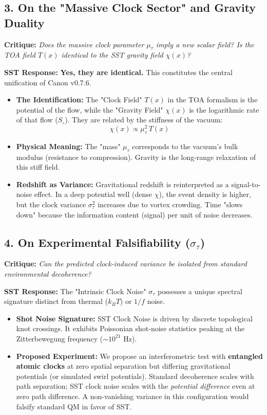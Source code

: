 \documentclass[10pt]{article}
\begin{document}
\subsection*{3. On the "Massive Clock Sector" and Gravity Duality}\label{sec:massive-clock-gravity}
\noindent \textbf{Critique:} \textit{Does the massive clock parameter $\mu_\tau$ imply a new scalar field? Is the TOA field $T(x)$ identical to the SST gravity field $\chi(x)$?}

\noindent \textbf{SST Response:}
\textbf{Yes, they are identical.} This constitutes the central unification of Canon v0.7.6.
\begin{itemize}
    \item \textbf{The Identification:} The "Clock Field" $T(x)$ in the TOA formalism is the potential of the flow, while the "Gravity Field" $\chi(x)$ is the logarithmic rate of that flow ($S_\circ$). They are related by the stiffness of the vacuum:
    \begin{equation}
        \chi(x) \propto \mu_\tau^2 \, T(x)
    \end{equation}
    \item \textbf{Physical Meaning:} The "mass" $\mu_\tau$ corresponds to the vacuum's bulk modulus (resistance to compression). Gravity is the long-range relaxation of this stiff field.
    \item \textbf{Redshift as Variance:} Gravitational redshift is reinterpreted as a signal-to-noise effect. In a deep potential well (dense $\chi$), the event density is higher, but the clock variance $\sigma_\tau^2$ increases due to vortex crowding. Time "slows down" because the information content (signal) per unit of noise decreases.
\end{itemize}

\subsection*{4. On Experimental Falsifiability ($\sigma_\tau$)}
\noindent \textbf{Critique:} \textit{Can the predicted clock-induced variance be isolated from standard environmental decoherence?}

\noindent \textbf{SST Response:}
The "Intrinsic Clock Noise" $\sigma_\tau$ possesses a unique spectral signature distinct from thermal ($k_B T$) or $1/f$ noise.
\begin{itemize}
    \item \textbf{Shot Noise Signature:} SST Clock Noise is driven by discrete topological knot crossings. It exhibits Poissonian shot-noise statistics peaking at the Zitterbewegung frequency ($\sim 10^{21}$ Hz).
    \item \textbf{Proposed Experiment:} We propose an interferometric test with \textbf{entangled atomic clocks} at zero spatial separation but differing gravitational potentials (or simulated swirl potentials). Standard decoherence scales with path separation; SST clock noise scales with the \textit{potential difference} even at zero path difference. A non-vanishing variance in this configuration would falsify standard QM in favor of SST.
\end{itemize}
\end{document}
